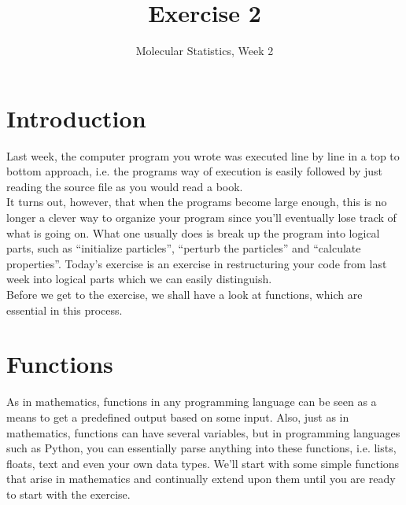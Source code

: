 \documentclass{article}
\title{Exercise 2}
\author{Molecular Statistics, Week 2}
\date{}
\begin{document}

\maketitle

\section{Introduction}


Last week, the computer program you wrote was executed line by line in a top to bottom approach, i.e. the programs way of execution is easily followed by just reading the source file as you would read a book.\\

It turns out, however, that when the programs become large enough, this is no longer a clever way to organize your program since you'll eventually lose track of what is going on.
What one usually does is break up the program into logical parts, such as “initialize particles”, “perturb the particles” and “calculate properties”.
Today's exercise is an exercise in restructuring your code from last week into logical parts which we can easily distinguish.\\

Before we get to the exercise, we shall have a look at functions, which are essential in this process.\\


\newpage
\section{Functions}





As in mathematics, functions in any programming language can be seen as a means to get a predefined output based on some input.
Also, just as in mathematics, functions can have several variables, but in programming languages
such as Python, you can essentially parse anything into these functions, i.e. lists, floats, text and even your own data types.
We'll start with some simple functions that arise in mathematics and continually extend upon them until you are ready to start with the exercise.\\
\end{document}

